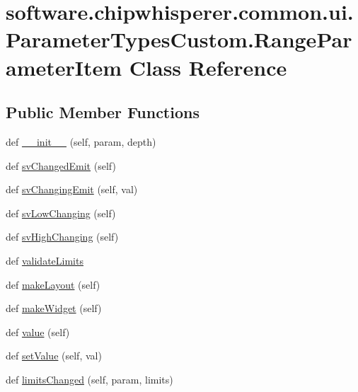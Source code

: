 \hypertarget{classsoftware_1_1chipwhisperer_1_1common_1_1ui_1_1ParameterTypesCustom_1_1RangeParameterItem}{}\section{software.\+chipwhisperer.\+common.\+ui.\+Parameter\+Types\+Custom.\+Range\+Parameter\+Item Class Reference}
\label{classsoftware_1_1chipwhisperer_1_1common_1_1ui_1_1ParameterTypesCustom_1_1RangeParameterItem}
\subsection*{Public Member Functions}
\begin{DoxyCompactItemize}
\item 
def \hyperlink{classsoftware_1_1chipwhisperer_1_1common_1_1ui_1_1ParameterTypesCustom_1_1RangeParameterItem_acf5f8efaaf101a4750d0c0fbc522c71b}{\+\_\+\+\_\+init\+\_\+\+\_\+} (self, param, depth)
\item 
def \hyperlink{classsoftware_1_1chipwhisperer_1_1common_1_1ui_1_1ParameterTypesCustom_1_1RangeParameterItem_af3dfe1f63b7206f3d674d6b132f67856}{sv\+Changed\+Emit} (self)
\item 
def \hyperlink{classsoftware_1_1chipwhisperer_1_1common_1_1ui_1_1ParameterTypesCustom_1_1RangeParameterItem_a22efe7244d00e74b08bd29983866143c}{sv\+Changing\+Emit} (self, val)
\item 
def \hyperlink{classsoftware_1_1chipwhisperer_1_1common_1_1ui_1_1ParameterTypesCustom_1_1RangeParameterItem_afbcb9db7ac0b3ad3bc7904fa75c40da9}{sv\+Low\+Changing} (self)
\item 
def \hyperlink{classsoftware_1_1chipwhisperer_1_1common_1_1ui_1_1ParameterTypesCustom_1_1RangeParameterItem_a3d17bd64572aaef9e66f1ff25461c857}{sv\+High\+Changing} (self)
\item 
def \hyperlink{classsoftware_1_1chipwhisperer_1_1common_1_1ui_1_1ParameterTypesCustom_1_1RangeParameterItem_af35a37706922bbc341046fdad72211d5}{validate\+Limits}
\item 
def \hyperlink{classsoftware_1_1chipwhisperer_1_1common_1_1ui_1_1ParameterTypesCustom_1_1RangeParameterItem_a9b6fc2a6cd7cebd83d049b9ea5eab51c}{make\+Layout} (self)
\item 
def \hyperlink{classsoftware_1_1chipwhisperer_1_1common_1_1ui_1_1ParameterTypesCustom_1_1RangeParameterItem_a8c875c77b13208db08a25a52bf4dad64}{make\+Widget} (self)
\item 
def \hyperlink{classsoftware_1_1chipwhisperer_1_1common_1_1ui_1_1ParameterTypesCustom_1_1RangeParameterItem_a58bcb383b97e5b2ef0f7dd645ecee500}{value} (self)
\item 
def \hyperlink{classsoftware_1_1chipwhisperer_1_1common_1_1ui_1_1ParameterTypesCustom_1_1RangeParameterItem_afa799128c6ecb45c9e03062601019b5f}{set\+Value} (self, val)
\item 
def \hyperlink{classsoftware_1_1chipwhisperer_1_1common_1_1ui_1_1ParameterTypesCustom_1_1RangeParameterItem_a3902cb1fde421b448db4cf0fd0170bda}{limits\+Changed} (self, param, limits)
\end{DoxyCompactItemize}
